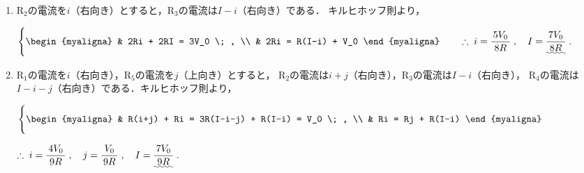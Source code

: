 ﻿\documentclass[../../../ps_a.tex]{subfiles}
\begin{document}
    \begin{enumerate}
        \item $\mathrm{R}_2$の電流を$i$（右向き）とすると，$\mathrm{R}_3$の電流は$I-i$（右向き）である．%
            キルヒホッフ則より，
            
            \myspaceb%
            $\displaystyle%
                \Biggl\{
                    \begin{myaligna}
                        & 2Ri + 2RI = 3V_0 \; , \\
                        & 2Ri = R(I-i) + V_0
                    \end{myaligna}
                \qquad \therefore \; i = \myfracc{5V_0}{8R} \;,
                \quad I = \uwave{\myfracc{7V_0}{8R}} \;.
            $
        \item $\mathrm{R}_1$の電流を$i$（右向き），$\mathrm{R}_5$の電流を$j$（上向き）とすると，%
            $\mathrm{R}_2$の電流は$i+j$（右向き），$\mathrm{R}_3$の電流は$I-i$（右向き），%
            $\mathrm{R}_4$の電流は$I-i-j$（右向き）である．キルヒホッフ則より，
            
            \myspaceb%
            $\displaystyle%
                 \Biggl\{
                    \begin{myaligna}
                        & R(i+j) + Ri = 3R(I-i-j) + R(I-i) = V_0 \; , \\
                        & Ri = Rj + R(I-i)
                    \end{myaligna}
            $

            \myspaceb%
            $\displaystyle%
                \therefore \; i = \myfracc{4V_0}{9R} \;,
                \quad j = \myfracc{V_0}{9R} \;,
                \quad I = \uwave{\myfracc{7V_0}{9R}} \;.
            $        
    \end{enumerate}
\end{document}
